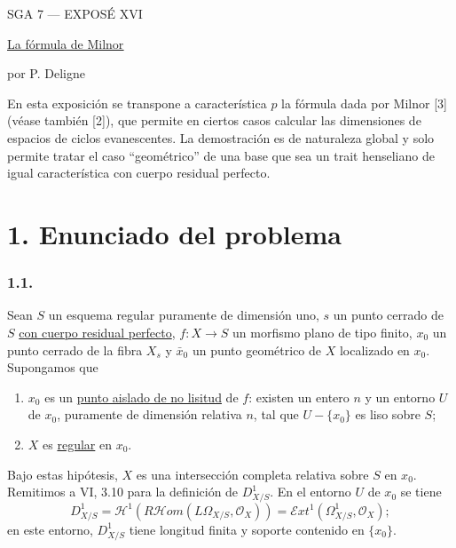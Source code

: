 \pageoriginale

\clearpage
{}
\begin{center}
{\large SGA 7 --- EXPOSÉ XVI}\par
\vspace{2em}
{\Large\underline{\underline{La fórmula de Milnor}}}\par
\vspace{1.5em}
{\large por P. Deligne}
\end{center}

\medskip
En esta exposición se transpone a característica $p$ la fórmula dada por
Milnor [3] (véase también [2]), que permite en ciertos casos calcular
las dimensiones de espacios de ciclos evanescentes. La demostración
es de naturaleza global y solo permite tratar el caso ``geométrico''
de una base que sea un trait henseliano de igual característica con
cuerpo residual perfecto.

\section*{1. Enunciado del problema}

\subsubsection*{1.1.}
Sean $S$ un esquema regular puramente de dimensión uno, $s$ un punto
cerrado de $S$ \underline{con cuerpo residual perfecto},
$f:X\to S$ un morfismo plano de tipo finito, $x_0$ un punto cerrado
de la fibra $X_s$ y $\bar x_0$ un punto geométrico de $X$ localizado
en $x_0$. Supongamos que
\begin{enumerate}
\item[(a)] $x_0$ es un \underline{punto aislado de no lisitud} de
$f$: existen un entero $n$ y un entorno $U$ de $x_0$, puramente de
dimensión relativa $n$, tal que $U-\{x_0\}$ es liso sobre $S$;
\item[(b)] $X$ es \underline{regular} en $x_0$.
\end{enumerate}

Bajo estas hipótesis, $X$ es una intersección completa relativa sobre
$S$ en $x_0$. Remitimos a VI, 3.10 para la definición de
$D^1_{X/S}$. En el entorno $U$ de $x_0$ se tiene
\[
D^1_{X/S}
=\mathcal H^1\!\left(R\mathcal Hom(L\Omega_{X/S},\mathcal O_X)\right)
=\mathcal Ext^1(\Omega^1_{X/S},\mathcal O_X);
\]
en este entorno, $D^1_{X/S}$ tiene longitud finita y soporte contenido
en $\{x_0\}$.

